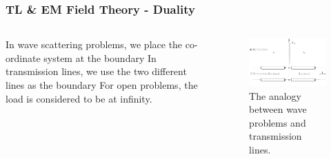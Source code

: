 \documentclass[10pt, compress]{beamer}
\begin{document}
\begin{frame}
  \frametitle{TL \& EM Field Theory - Duality}
  \begin{columns}[T] %
  \begin{column}{.3\textwidth}
\begin{outline}
  \1 In wave scattering problems, we place the co-ordinate system at the boundary
  \1 In transmission lines, we use the two different lines as the boundary
  \1 For open problems, the load is considered to be at infinity.
  \end{outline}
   \end{column}
 \begin{column}[T]{.7\textwidth}
    \begin{figure}
      \centering
          \includegraphics[width=.9\textwidth]{circuit.pdf}
      \caption{The analogy between wave problems and transmission lines.}
    \end{figure}
      \end{column}%
\end{columns}
  \end{frame}
\end{document}
